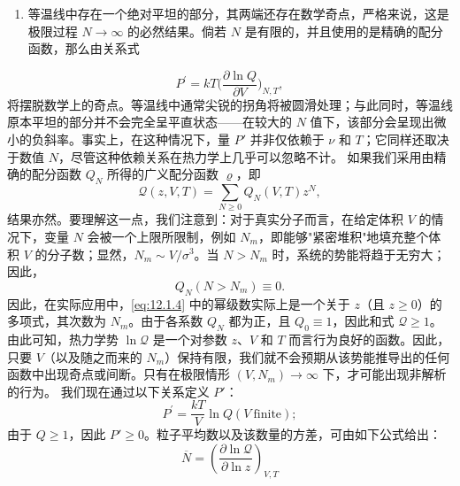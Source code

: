 \begin{enumerate}
\def\labelenumi{(\roman{enumi})}
\setcounter{enumi}{2}
\item
  等温线中存在一个绝对平坦的部分，其两端还存在数学奇点，严格来说，这是极限过程 \(N \to \infty\) 的必然结果。倘若 \(N\) 是有限的，并且使用的是精确的配分函数，那么由关系式
\end{enumerate}
\begin{equation}\tag{12.1.3}\label{eq:12.1.3}
P ^{\prime} = k T \bigg ( \frac { \partial \ln Q } { \partial V } \bigg ) _ { N , T } ,
\end{equation}
将摆脱数学上的奇点。等温线中通常尖锐的拐角将被圆滑处理；与此同时，等温线原本平坦的部分并不会完全呈平直状态——在较大的 \(N\) 值下，该部分会呈现出微小的负斜率。事实上，在这种情况下，量 \(P'\) 并非仅依赖于 \(\nu\) 和 \(T\)；它同样还取决于数值 \(N\)，尽管这种依赖关系在热力学上几乎可以忽略不计。
如果我们采用由精确的配分函数 \(Q_{N}\) 所得的广义配分函数 \(\varrho\)，即
\begin{equation}\tag{12.1.4}\label{eq:12.1.4}
\mathcal { Q } ( z , V , T ) = \sum _ { N \geq 0 } Q _ { N } ( V , T ) z ^{N} ,
\end{equation}
结果亦然。要理解这一点，我们注意到：对于真实分子而言，在给定体积 \(V\) 的情况下，变量 \(N\) 会被一个上限所限制，例如 \(N_{m}\)，即能够"紧密堆积"地填充整个体积 \(V\) 的分子数；显然，\(N_{m} \sim V/\sigma^{3}\)。当 \(N > N_{m}\) 时，系统的势能将趋于无穷大；因此，
\begin{equation}\tag{12.1.5}\label{eq:12.1.5}
Q _ { N } ( N > N _ { m } ) \equiv 0 .
\end{equation}
因此，在实际应用中，\autoref{eq:12.1.4} 中的幂级数实际上是一个关于 \(z\)（且 \(z \geq 0\)）的多项式，其次数为 \(N_{m}\)。由于各系数 \(Q_{N}\) 都为正，且 \(Q_{0} \equiv 1\)，因此和式 \(\mathcal{Q} \geq 1\)。由此可知，热力学势 \(\ln \mathcal{Q}\) 是一个对参数 \(z\)、\(V\) 和 \(T\) 而言行为良好的函数。因此，只要 \(V\)（以及随之而来的 \(N_{m}\)）保持有限，我们就不会预期从该势能推导出的任何函数中出现奇点或间断。只有在极限情形 \((V, N_{m}) \rightarrow \infty\) 下，才可能出现非解析的行为。
我们现在通过以下关系定义 \(P'\)：
\begin{equation}\tag{12.1.6}\label{eq:12.1.6}
P ^{\prime} = { \frac { k T } { V } } \ln Q  ( V { \mathrm { ~ f i n i t e } } ) ;
\end{equation}
由于 \(Q \geq 1\)，因此 \(P' \geq 0\)。粒子平均数以及该数量的方差，可由如下公式给出：
\begin{equation}\tag{12.1.7}\label{eq:12.1.7}
\overline { { N } } = \left( \frac { \partial \ln \mathcal { Q } } { \partial \ln z } \right) _ { V , T }
\end{equation}
